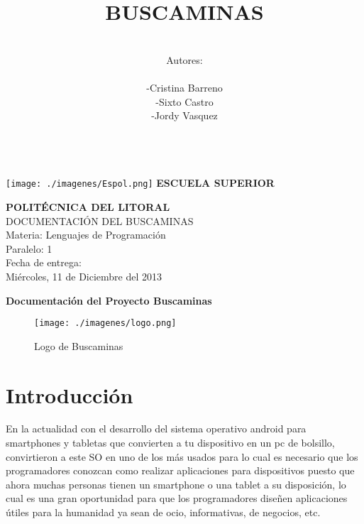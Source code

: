 \documentclass[11pt]{article} %
\title{\fontsize{30}{0} \bf BUSCAMINAS}
\author{\\Autores: \\  \\-Cristina Barreno \\ -Sixto Castro \\ -Jordy Vasquez\\ \\}
\begin{document}
\newpage

 \texttt{[image: ./imagenes/Espol.png]}{ \fontsize{18}{0} \bf ESCUELA SUPERIOR \\}
\begin{center}
{\fontsize{18}{0} \bf POLITÉCNICA DEL LITORAL\\}
\vspace{2cm}
{\LARGE{ DOCUMENTACIÓN DEL BUSCAMINAS }}\\
\vspace{2cm}
{\LARGE{ Materia: Lenguajes de Programación }}\\
\vspace{2cm}
{\LARGE{ Paralelo: 1}}\\
\vspace{2cm}
{\LARGE{Fecha de entrega: \\  Miércoles, 11 de Diciembre del 2013}}
\thispagestyle{empty}
\end{center}


\maketitle



\newpage
\begin{center}
 {\fontsize{16}{0} \bf Documentación del Proyecto Buscaminas}
\begin{figure}[h]
\centering
 \texttt{[image: ./imagenes/logo.png]}
\caption{Logo de Buscaminas}\label{Fig:Logo de BuscaminasL}
\end{figure}
\end{center}

\newpage
\tableofcontents %
\thispagestyle{empty}

\newpage
\section{\fontsize{14}{0} \bf Introducción}

En la actualidad con el desarrollo del sistema operativo android para smartphones y tabletas que convierten a tu dispositivo en un pc de bolsillo, convirtieron a este SO en uno de los más usados para lo cual es necesario que los programadores conozcan como realizar aplicaciones para dispositivos puesto que ahora muchas personas tienen un smartphone o una tablet a su disposición, lo cual es una gran oportunidad para que los programadores diseñen aplicaciones útiles para la humanidad ya sean de ocio, informativas, de negocios, etc.\\ \\
\end{document}
